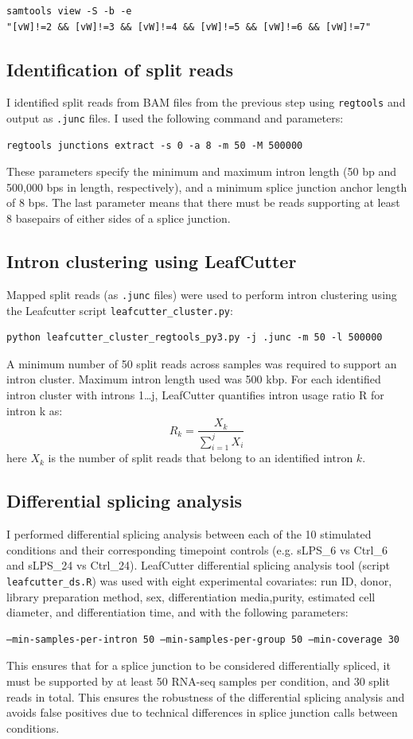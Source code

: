 \begin{verbatim}
samtools view -S -b -e 
"[vW]!=2 && [vW]!=3 && [vW]!=4 && [vW]!=5 && [vW]!=6 && [vW]!=7"
\end{verbatim}

\subsection{Identification of split reads}
I identified split reads from BAM files from the previous step using \Verb_regtools_ \cite{Cotto2023-yp} and output as \Verb_.junc_ files. I used the following command and parameters:
\begin{verbatim}regtools junctions extract -s 0 -a 8 -m 50 -M 500000 \end{verbatim}
These parameters specify the minimum and maximum intron length (50 bp and 500,000 bps in length, respectively), and a minimum splice junction anchor length of 8 bps. The last parameter means that there must be reads supporting at least 8 basepairs of either sides of a splice junction. 

\subsection{Intron clustering using LeafCutter}
Mapped split reads (as \Verb_.junc_ files) were used to perform intron clustering using the Leafcutter script \Verb+leafcutter_cluster.py+:

\begin{verbatim}
python leafcutter_cluster_regtools_py3.py -j .junc -m 50 -l 500000
\end{verbatim}
A minimum number of 50 split reads across samples was required to support an intron cluster. Maximum intron length used was 500 kbp. 
For each identified intron cluster with introns 1…j, LeafCutter quantifies intron usage ratio R for intron k as:
$$R_{k}=\frac{X_k}{ \sum_{i=1}^{j}X_{i} }$$
here $X_k$ is the number of split reads that belong to an identified intron $k$.

\subsection{Differential splicing analysis}
I performed differential splicing analysis between each of the 10 stimulated conditions and their corresponding timepoint controls (e.g. sLPS\_6 vs Ctrl\_6 and sLPS\_24 vs Ctrl\_24). LeafCutter differential splicing analysis tool (script \Verb+leafcutter_ds.R+)\cite{Li2018-ll} was used with eight experimental covariates: run ID, donor, library preparation method, sex, differentiation media,purity,  estimated cell diameter, and differentiation time, and with  the following parameters:
\begin{verbatim}
–min-samples-per-intron 50 –min-samples-per-group 50 –min-coverage 30
\end{verbatim}
This ensures that for a splice junction to be considered differentially spliced, it must be supported by at least 50 RNA-seq samples per condition, and 30 split reads in total. This ensures the robustness of the differential splicing analysis and avoids false positives due to technical differences in splice junction calls between conditions.


